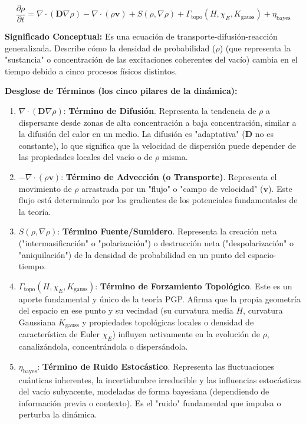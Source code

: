 \documentclass{article}
\begin{document}
\begin{equation*}
\frac{\partial\rho}{\partial t} = \nabla\cdot(\mathbf{D}\nabla\rho) - \nabla\cdot(\rho\mathbf{v}) + S(\rho,\nabla\rho) + \Gamma_{\text{topo}}(H, \chi_E, K_{\text{gauss}}) + \eta_{\text{bayes}}
\end{equation*}

\textbf{Significado Conceptual:} Es una ecuación de transporte-difusión-reacción generalizada. Describe cómo la densidad de probabilidad ($\rho$) (que representa la "sustancia" o concentración de las excitaciones coherentes del vacío) cambia en el tiempo debido a cinco procesos físicos distintos.

\textbf{Desglose de Términos (los cinco pilares de la dinámica):}
\begin{enumerate}
    \item $\nabla\cdot(\mathbf{D}\nabla\rho)$: \textbf{Término de Difusión}. Representa la tendencia de $\rho$ a dispersarse desde zonas de alta concentración a baja concentración, similar a la difusión del calor en un medio. La difusión es "adaptativa" ($\mathbf{D}$ no es constante), lo que significa que la velocidad de dispersión puede depender de las propiedades locales del vacío o de $\rho$ misma.
    \item $-\nabla\cdot(\rho\mathbf{v})$: \textbf{Término de Advección (o Transporte)}. Representa el movimiento de $\rho$ arrastrada por un "flujo" o "campo de velocidad" ($\mathbf{v}$). Este flujo está determinado por los gradientes de los potenciales fundamentales de la teoría.
    \item $S(\rho,\nabla\rho)$: \textbf{Término Fuente/Sumidero}. Representa la creación neta ("intermasificación" o "polarización") o destrucción neta ("despolarización" o "aniquilación") de la densidad de probabilidad en un punto del espacio-tiempo.
    \item $\Gamma_{\text{topo}}(H, \chi_E, K_{\text{gauss}})$: \textbf{Término de Forzamiento Topológico}. Este es un aporte fundamental y único de la teoría PGP. Afirma que la propia geometría del espacio en ese punto y su vecindad (su curvatura media $H$, curvatura Gaussiana $K_{\text{gauss}}$ y propiedades topológicas locales o densidad de característica de Euler $\chi_E$) influyen activamente en la evolución de $\rho$, canalizándola, concentrándola o dispersándola.
    \item $\eta_{\text{bayes}}$: \textbf{Término de Ruido Estocástico}. Representa las fluctuaciones cuánticas inherentes, la incertidumbre irreducible y las influencias estocásticas del vacío subyacente, modeladas de forma bayesiana (dependiendo de información previa o contexto). Es el "ruido" fundamental que impulsa o perturba la dinámica.
\end{enumerate}
\end{document}
